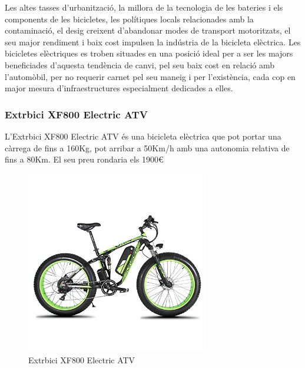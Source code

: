 Les altes tasses d'urbanització, la millora de la tecnologia de les bateries i els components de les bicicletes, les polítiques locals relacionades amb la contaminació, el desig creixent d'abandonar modes de transport motoritzats, el seu major rendiment i baix cost impulsen la indústria de la bicicleta elèctrica. Les bicicletes elèctriques es troben situades en una posició ideal per a ser les majors beneficiades d'aquesta tendència de canvi, pel seu baix cost en relació amb l'automòbil, per no requerir carnet pel seu maneig i per l'existència, cada cop en major mesura d'infraestructures especialment dedicades a elles. \newline \bigskip

             
\subsubsection{Extrbici XF800 Electric ATV } 
L'Extrbici XF800 Electric ATV és una bicicleta elèctrica que pot portar una càrrega de fins a 160Kg, pot arribar a 50Km/h amb una autonomia relativa de fins a 80Km. El seu preu rondaria els 1900€
\begin{figure}[H]
		\centering
    	\includegraphics[width=8cm, height=8cm]{Marcteoric/extrbicixf800electricatv.jpg}
     	\caption{Extrbici XF800 Electric ATV}
\end{figure}
                      
